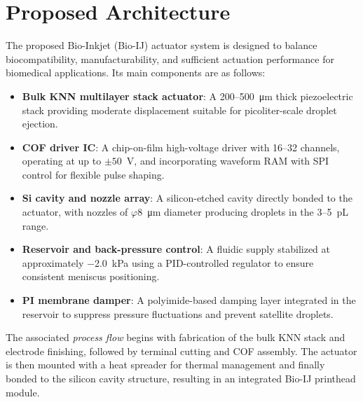 \section{Proposed Architecture}
The proposed Bio-Inkjet (Bio-IJ) actuator system is designed to balance
biocompatibility, manufacturability, and sufficient actuation
performance for biomedical applications. Its main components are as
follows:
\begin{itemize}
  \item \textbf{Bulk KNN multilayer stack actuator}:
        A 200--500~\si{\micro\meter} thick piezoelectric stack providing
        moderate displacement suitable for picoliter-scale droplet
        ejection.
  \item \textbf{COF driver IC}:
        A chip-on-film high-voltage driver with 16--32 channels,
        operating at up to $\pm 50$~\si{\volt}, and incorporating waveform RAM
        with SPI control for flexible pulse shaping.
  \item \textbf{Si cavity and nozzle array}:
        A silicon-etched cavity directly bonded to the actuator, with
        nozzles of $\varphi$\SI{8}{\micro\meter} diameter producing
        droplets in the 3--5~\si{\pico\liter} range.
  \item \textbf{Reservoir and back-pressure control}:
        A fluidic supply stabilized at approximately \SI{-2.0}{\kilo\pascal}
        using a PID-controlled regulator to ensure consistent meniscus
        positioning.
  \item \textbf{PI membrane damper}:
        A polyimide-based damping layer integrated in the reservoir to
        suppress pressure fluctuations and prevent satellite droplets.
\end{itemize}

The associated \textit{process flow} begins with fabrication of the bulk
KNN stack and electrode finishing, followed by terminal cutting and COF
assembly. The actuator is then mounted with a heat spreader for thermal
management and finally bonded to the silicon cavity structure,
resulting in an integrated Bio-IJ printhead module.


